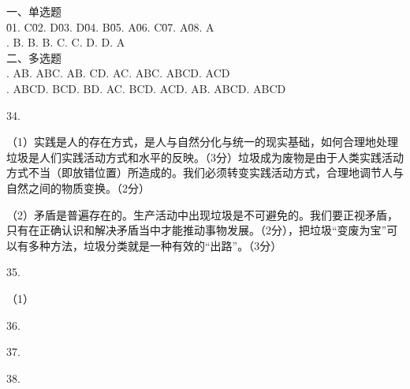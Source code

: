 \documentclass[a4paper]{article}
\begin{document}
\begin{tabbing}
一、单选题\\
\= 01. C\qquad \= 02. D\qquad \= 03. D\qquad \= 04. B\qquad \= 05. A\qquad \= 06. C\qquad \= 07. A\qquad \= 08. A\qquad \= \\
. B. B. B. C. C. D. D. A\\
二、多选题\\
. AB. ABC. AB. CD. AC. ABC. ABCD. ACD\\
. ABCD. BCD. BD. AC. BCD. ACD. AB. ABCD. ABCD\\
\end{tabbing}

34.

（1）实践是人的存在方式，是人与自然分化与统一的现实基础，如何合理地处理垃圾是人们实践活动方式和水平的反映。（3分）垃圾成为废物是由于人类实践活动方式不当（即放错位置）所造成的。我们必须转变实践活动方式，合理地调节人与自然之间的物质变换。（2分）

（2）矛盾是普遍存在的。生产活动中出现垃圾是不可避免的。我们要正视矛盾，只有在正确认识和解决矛盾当中才能推动事物发展。（2分），把垃圾“变废为宝”可以有多种方法，垃圾分类就是一种有效的“出路”。（3分）

35.

（1）

36.

37.

38.
\end{document}

